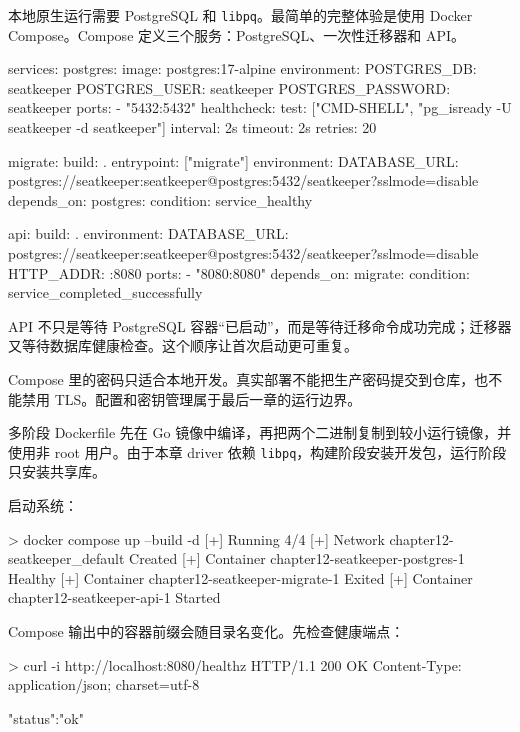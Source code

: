 本地原生运行需要 PostgreSQL 和 \texttt{libpq}。最简单的完整体验是使用 Docker Compose。Compose 定义三个服务：PostgreSQL、一次性迁移器和 API。

\begin{yamlcode}[title={代码清单 12.47 \texttt{docker-compose.yml}：本地拓扑}]
services:
  postgres:
    image: postgres:17-alpine
    environment:
      POSTGRES_DB: seatkeeper
      POSTGRES_USER: seatkeeper
      POSTGRES_PASSWORD: seatkeeper
    ports:
      - "5432:5432"
    healthcheck:
      test: ["CMD-SHELL", "pg_isready -U seatkeeper -d seatkeeper"]
      interval: 2s
      timeout: 2s
      retries: 20

  migrate:
    build: .
    entrypoint: ["migrate"]
    environment:
      DATABASE_URL: postgres://seatkeeper:seatkeeper@postgres:5432/seatkeeper?sslmode=disable
    depends_on:
      postgres:
        condition: service_healthy

  api:
    build: .
    environment:
      DATABASE_URL: postgres://seatkeeper:seatkeeper@postgres:5432/seatkeeper?sslmode=disable
      HTTP_ADDR: :8080
    ports:
      - "8080:8080"
    depends_on:
      migrate:
        condition: service_completed_successfully
\end{yamlcode}

API 不只是等待 PostgreSQL 容器“已启动”，而是等待迁移命令成功完成；迁移器又等待数据库健康检查。这个顺序让首次启动更可重复。

Compose 里的密码只适合本地开发。真实部署不能把生产密码提交到仓库，也不能禁用 TLS。配置和密钥管理属于最后一章的运行边界。

多阶段 Dockerfile 先在 Go 镜像中编译，再把两个二进制复制到较小运行镜像，并使用非 root 用户。由于本章 driver 依赖 \texttt{libpq}，构建阶段安装开发包，运行阶段只安装共享库。

启动系统：

\begin{shellcode}[title={构建并启动 SeatKeeper}]
> docker compose up --build -d
[+] Running 4/4
 [+] Network chapter12-seatkeeper_default  Created
 [+] Container chapter12-seatkeeper-postgres-1  Healthy
 [+] Container chapter12-seatkeeper-migrate-1   Exited
 [+] Container chapter12-seatkeeper-api-1       Started
\end{shellcode}
\color{PocketInk}

Compose 输出中的容器前缀会随目录名变化。先检查健康端点：

\begin{shellcode}[]
> curl -i http://localhost:8080/healthz
HTTP/1.1 200 OK
Content-Type: application/json; charset=utf-8

{"status":"ok"}
\end{shellcode}
\color{PocketInk}

